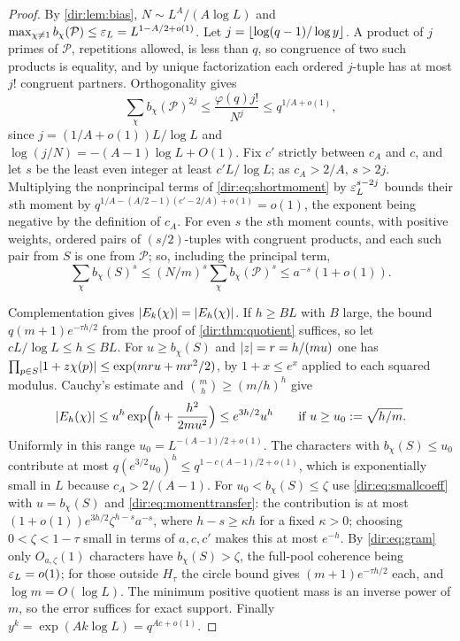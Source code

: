\begin{proof}
By \cref{dir:lem:bias}, $N\sim L^A/(A\log L)$ and $\max_{\chi\ne1}b_\chi(\mathcal P)\le\varepsilon_L
=L^{1-A/2+o(1)}$. Let $j=\lfloor\log(q-1)/\log y\rfloor$. A product of $j$ primes of $\mathcal P$,
repetitions allowed, is less than $q$, so congruence of two such products is equality, and by
unique factorization each ordered $j$-tuple has at most $j!$ congruent partners. Orthogonality
gives
\begin{equation}\label{dir:eq:shortmoment}
 \sum_\chi b_\chi(\mathcal P)^{2j}\le\frac{\varphi(q)j!}{N^j}\le q^{1/A+o(1)},
\end{equation}
since $j=(1/A+o(1))L/\log L$ and $\log(j/N)=-(A-1)\log L+O(1)$. Fix $c'$ strictly between $c_A$
and $c$, and let $s$ be the least even integer at least $c'L/\log L$; as $c_A>2/A$, $s>2j$.
Multiplying the nonprincipal terms of \eqref{dir:eq:shortmoment} by $\varepsilon_L^{s-2j}$ bounds
their $s$th moment by $q^{1/A-(A/2-1)(c'-2/A)+o(1)}=o(1)$, the exponent being negative by the
definition of $c_A$. For even $s$ the $s$th moment counts, with positive weights, ordered pairs
of $(s/2)$-tuples with congruent products, and each such pair from $S$ is one from
$\mathcal P$; so, including the principal term,
\begin{equation}\label{dir:eq:momenttransfer}
 \sum_\chi b_\chi(S)^s\le(N/m)^s\sum_\chi b_\chi(\mathcal P)^s\le a^{-s}(1+o(1)).
\end{equation}

Complementation gives $\lvert E_k(\chi)\rvert=\lvert E_h(\chi)\rvert$. If $h\ge BL$ with $B$ large, the
bound $q(m+1)e^{-\tau h/2}$ from the proof of \cref{dir:thm:quotient} suffices, so let
$cL/\log L\le h\le BL$. For $u\ge b_\chi(S)$ and $\lvert z\rvert=r=h/(mu)$ one has
$\prod_{p\in S}\lvert1+z\chi(p)\rvert\le\exp(mru+mr^2/2)$, by $1+x\le e^x$ applied to each squared
modulus. Cauchy's estimate and $\binom mh\ge(m/h)^h$ give
\begin{equation}\label{dir:eq:smallcoeff}
 \lvert E_h(\chi)\rvert\le u^h\exp\Bigl(h+\frac{h^2}{2mu^2}\Bigr)\le e^{3h/2}u^h
 \qquad\text{if }u\ge u_0:=\sqrt{h/m}.
\end{equation}
Uniformly in this range $u_0=L^{-(A-1)/2+o(1)}$. The characters with $b_\chi(S)\le u_0$
contribute at most $q(e^{3/2}u_0)^h\le q^{1-c(A-1)/2+o(1)}$, which is exponentially small in
$L$ because $c_A>2/(A-1)$. For $u_0<b_\chi(S)\le\zeta$ use \eqref{dir:eq:smallcoeff} with
$u=b_\chi(S)$ and \eqref{dir:eq:momenttransfer}: the contribution is at most
$(1+o(1))e^{3h/2}\zeta^{h-s}a^{-s}$, where $h-s\ge\kappa h$ for a fixed $\kappa>0$; choosing
$0<\zeta<1-\tau$ small in terms of $a,c,c'$ makes this at most $e^{-h}$. By \eqref{dir:eq:gram}
only $O_{a,\zeta}(1)$ characters have $b_\chi(S)>\zeta$, the full-pool coherence being
$\varepsilon_L=o(1)$; for those outside $H_\tau$ the circle bound gives $(m+1)e^{-\tau h/2}$ each, and
$\log m=O(\log L)$. The minimum positive quotient mass is an inverse power of $m$, so the error
suffices for exact support. Finally $y^k=\exp(Ak\log L)=q^{Ac+o(1)}$.
\end{proof}

